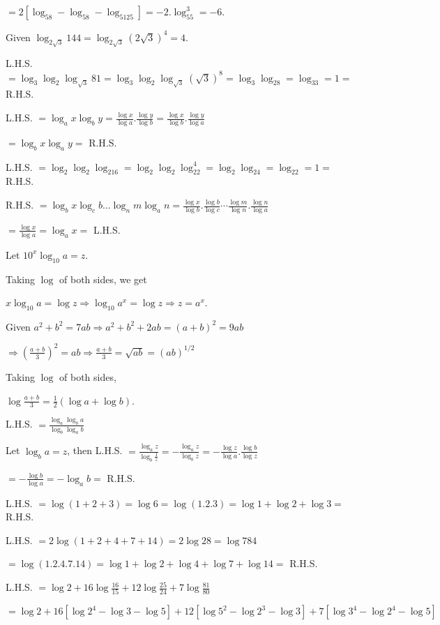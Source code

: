   $= 2[\log_58 - \log_58 - \log_5125] = -2.\log_55^3 = -6$.
\item Given $\log_{2\sqrt{3}}144 = \log_{2\sqrt{3}}(2\sqrt{3})^4 = 4$.
\item L.H.S. $= \log_3\log_2\log_{\sqrt{3}}81 = \log_3\log_2\log_{\sqrt{3}}(\sqrt{3})^8 = \log_3\log_28 = \log_33 = 1 =$ R.H.S.
\item L.H.S. $= \log_ax\log_by = \frac{\log x}{\log a}.\frac{\log y}{\log b} = \frac{\log x}{\log b}.\frac{\log y}{\log a}$

  $= \log_bx\log_ay =$ R.H.S.
\item L.H.S. $= \log_2\log_2\log_216 = \log_2\log_2\log_22^4 = \log_2\log_24 = \log_22 = 1 =$ R.H.S.
\item R.H.S. $= \log_bx\log_cb\ldots\log_nm\log_an = \frac{\log x}{\log b}.\frac{\log b}{\log c}\cdots\frac{\log m}{\log
  n}.\frac{\log n}{\log a}$

  $= \frac{\log x}{\log a} = \log_ax =$ L.H.S.
\item Let $10^x\log_{10}a = z$.

  Taking $\log$ of both sides, we get

  $x\log_{10}a = \log z \Rightarrow \log_{10}a^x = \log z \Rightarrow z = a^x$.
\item Given $a^2 + b^2 = 7ab \Rightarrow a^2 + b^2 + 2ab = (a + b)^2 = 9ab$

  $\Rightarrow \left(\frac{a + b}{3}\right)^2 = ab \Rightarrow \frac{a + b}{3} = \sqrt{ab} = (ab)^{1/2}$

  Taking $\log$ of both sides,

  $\log \frac{a + b}{3} = \frac{1}{2}(\log a + \log b)$.
\item L.H.S. $= \frac{\log_a\log_ba}{\log_b\log_ab}$

  Let $\log_ba = z$, then L.H.S. $= \frac{\log_az}{\log_b\tfrac{1}{z}} = -\frac{\log_az}{\log_bz} = -\frac{\log z}{\log a}.\frac{\log b}{\log z}$

  $= - \frac{\log b}{\log a} = -\log_ab =$ R.H.S.
\item L.H.S. $= \log(1 + 2 + 3) = \log 6 = \log(1.2.3) = \log 1 + \log 2 + \log 3 =$ R.H.S.
\item L.H.S. $= 2\log(1 + 2 + 4 + 7 + 14) = 2\log 28 = \log 784$

  $= \log(1.2.4.7.14) = \log 1 + \log 2 + \log 4 + \log 7 + \log 14 =$ R.H.S.
\item L.H.S. $= \log 2 + 16\log\frac{16}{15} + 12\log\frac{25}{24} + 7\log\frac{81}{80}$

  $= \log 2 + 16[\log 2^4 - \log 3 - \log 5] + 12[\log 5^2 - \log 2^3 - \log 3] + 7[\log 3^4 - \log 2^4 - \log 5]$

